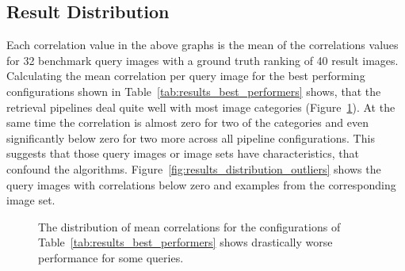 \subsection{Result Distribution}\label{sec:results_distribution}

Each correlation value in the above graphs is the mean of the correlations
values for 32 benchmark query images with a ground truth ranking of 40 result
images. Calculating the mean correlation per query image for the best
performing configurations shown in Table~\ref{tab:results_best_performers}
shows, that the retrieval pipelines deal quite well with most image categories
(Figure~\ref{fig:results_distribution}). At the same time the correlation is
almost zero for two of the categories and even significantly below zero for two
more across all pipeline configurations. This suggests that those query images
or image sets have characteristics, that confound the algorithms.
Figure~\ref{fig:results_distribution_outliers} shows the query images with
correlations below zero and examples from the corresponding image set.

\begin{figure}[h]
    \centering
    
    \caption[Distribution of results]{
        The distribution of mean correlations for the configurations of
        Table~\ref{tab:results_best_performers} shows drastically worse
        performance for some queries.
    }
    \label{fig:results_distribution}
\end{figure}

